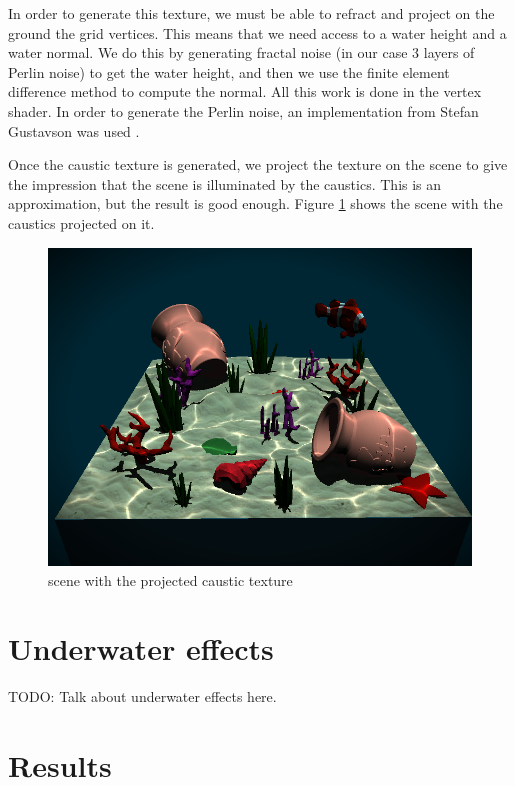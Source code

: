 \documentclass{article}
\begin{document}
In order to generate this texture, we must be able to refract and project on the ground the grid vertices. This means that we need access to a water height and a water normal. We do this by generating fractal noise (in our case 3 layers of Perlin noise) to get the water height, and then we use the finite element difference method to compute the normal. All this work is done in the vertex shader. In order to generate the Perlin noise, an implementation from Stefan Gustavson was used \cite{perlin_noise}.

Once the caustic texture is generated, we project the texture on the scene to give the impression that the scene is illuminated by the caustics. This is an approximation, but the result is good enough. Figure \ref{fig:scene_with_caustics} shows the scene with the caustics projected on it.

\begin{figure}[h]
 \includegraphics[width=\columnwidth]{imgs/scene_with_caustics.png}
 \caption{scene with the projected caustic texture}
 \label{fig:scene_with_caustics}
\end{figure}

\section{Underwater effects}

TODO: Talk about underwater effects here.

\section{Results}
\end{document}
